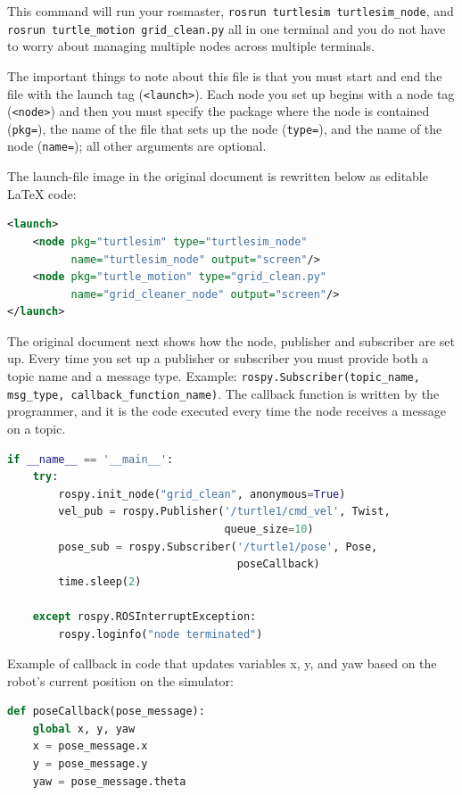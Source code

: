 \documentclass[11pt]{article}
\begin{document}
This command will run your rosmaster, \texttt{rosrun turtlesim turtlesim\_node}, and \texttt{rosrun turtle\_motion grid\_clean.py} all in one terminal and you do not have to worry about managing multiple nodes across multiple terminals.

The important things to note about this file is that you must start and end the file with the launch tag (\texttt{<launch>}). Each node you set up begins with a node tag (\texttt{<node>}) and then you must specify the package where the node is contained (\texttt{pkg=}), the name of the file that sets up the node (\texttt{type=}), and the name of the node (\texttt{name=}); all other arguments are optional.

The launch-file image in the original document is rewritten below as editable LaTeX code:
\begin{lstlisting}[language=XML]
<launch>
    <node pkg="turtlesim" type="turtlesim_node"
          name="turtlesim_node" output="screen"/>
    <node pkg="turtle_motion" type="grid_clean.py"
          name="grid_cleaner_node" output="screen"/>
</launch>
\end{lstlisting}

The original document next shows how the node, publisher and subscriber are set up. Every time you set up a publisher or subscriber you must provide both a topic name and a message type. Example: \texttt{rospy.Subscriber(topic\_name, msg\_type, callback\_function\_name)}. The callback function is written by the programmer, and it is the code executed every time the node receives a message on a topic.

\begin{lstlisting}[language=Python]
if __name__ == '__main__':
    try:
        rospy.init_node("grid_clean", anonymous=True)
        vel_pub = rospy.Publisher('/turtle1/cmd_vel', Twist,
                                  queue_size=10)
        pose_sub = rospy.Subscriber('/turtle1/pose', Pose,
                                    poseCallback)
        time.sleep(2)

    except rospy.ROSInterruptException:
        rospy.loginfo("node terminated")
\end{lstlisting}

Example of callback in code that updates variables x, y, and yaw based on the robot's current position on the simulator:

\begin{lstlisting}[language=Python]
def poseCallback(pose_message):
    global x, y, yaw
    x = pose_message.x
    y = pose_message.y
    yaw = pose_message.theta
\end{lstlisting}
\end{document}
